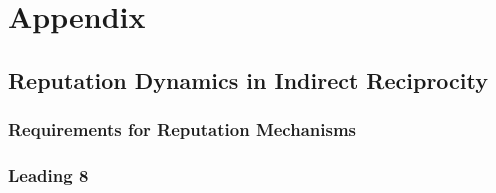 \chapter{Appendix}
\label{chap:Appendix}



\section{Reputation Dynamics in Indirect Reciprocity}
\label{sec:Reputation Dynamics in Indirect Reciprocity}


\subsection{Requirements for Reputation Mechanisms}
\label{subsec:Requirements for Reputation Mechanisms}


\subsection{Leading 8}
\label{subsec:Leading 8}